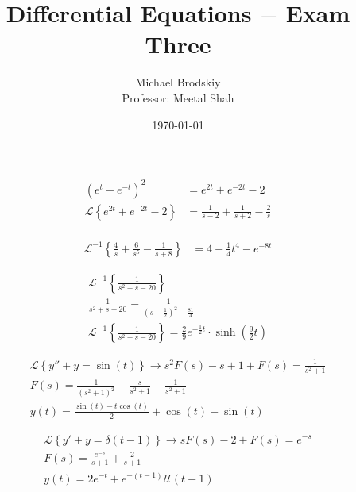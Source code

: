 \documentclass[12pt]{article}
\title{Differential Equations $-$ Exam Three}
\date{\today}
\author{Michael Brodskiy\\ \small Professor: Meetal Shah}
\begin{document}
\maketitle

\hline
\begin{equation}
  \begin{split}
    (e^t-e^{-t})^2&=e^{2t}+e^{-2t}-2\\
    \mathcal{L}\left\{ e^{2t}+e^{-2t}-2 \right\}&=\frac{1}{s-2}+\frac{1}{s+2}-\frac{2}{s}\\
  \end{split}
  \label{1}
\end{equation}
\hline

\begin{equation}
  \begin{split}
    \mathcal{L}^{-1}\left\{ \frac{4}{s}+\frac{6}{s^5}-\frac{1}{s+8} \right\}&=4+\frac{1}{4}t^4-e^{-8t}
  \end{split}
  \label{2}
\end{equation}

\hline
\begin{equation}
  \begin{split}
    \mathcal{L}^{-1}\left\{ \frac{1}{s^2+s-20} \right\}\\
    \frac{1}{s^2+s-20}=\frac{1}{\left(s-\frac{1}{2}\right)^2-\frac{81}{4}}\\
    \mathcal{L}^{-1}\left\{ \frac{1}{s^2+s-20} \right\}=\frac{2}{9}e^{-\frac{1}{2}t}\cdot\sinh\left( \frac{9}{2}t \right)
  \end{split}
  \label{3}
\end{equation}

\hline
\begin{equation}
  \begin{split}
    \mathcal{L}\left\{ y''+y=\sin(t) \right\}\rightarrow s^2F(s)-s+1+F(s)=\frac{1}{s^2+1}\\
    F(s)=\frac{1}{\left( s^2+1 \right)^2}+\frac{s}{s^2+1}-\frac{1}{s^2+1}\\
    y(t)=\frac{\sin(t)-t\cos(t)}{2}+\cos(t)-\sin(t)
  \end{split}
  \label{4}
\end{equation}

\hline
\begin{equation}
  \begin{split}
    \mathcal{L}\left\{ y'+y=\delta(t-1) \right\}\rightarrow sF(s)-2+F(s)=e^{-s}\\
    F(s)=\frac{e^{-s}}{s+1}+\frac{2}{s+1}\\
    y(t)=2e^{-t}+e^{-(t-1)}\mathcal{U}(t-1)
  \end{split}
  \label{5}
\end{equation}
\hline
\end{document}
